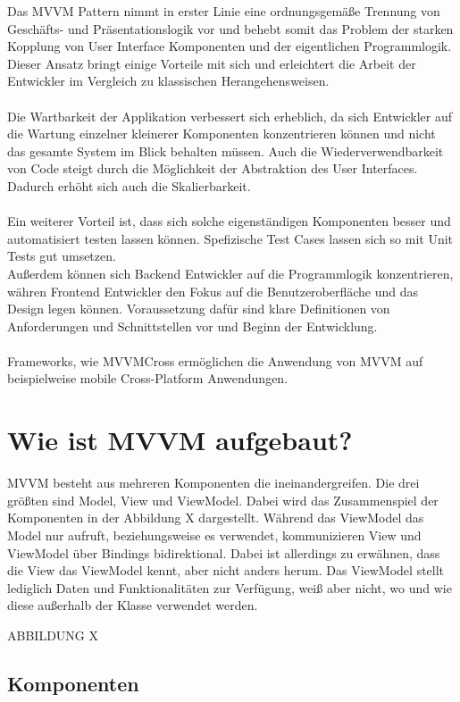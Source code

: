 \documentclass[titlepage=false,12pt]{scrreprt}
\begin{document}
Das MVVM Pattern nimmt in erster Linie eine ordnungsgemäße Trennung von Geschäfts- und Präsentationslogik vor und
behebt somit das Problem der starken Kopplung von User Interface Komponenten und der eigentlichen Programmlogik.
Dieser Ansatz bringt einige Vorteile mit sich und erleichtert die Arbeit der Entwickler im Vergleich zu klassischen
Herangehensweisen.\\
\\
Die Wartbarkeit der Applikation verbessert sich erheblich, da sich Entwickler auf die Wartung einzelner kleinerer
Komponenten konzentrieren können und nicht das gesamte System im Blick behalten müssen. Auch die Wiederverwendbarkeit
von Code steigt durch die Möglichkeit der Abstraktion des User Interfaces. Dadurch erhöht sich auch die Skalierbarkeit.\\
\\
Ein weiterer Vorteil ist, dass sich solche eigenständigen Komponenten besser und automatisiert testen lassen können.
Spefizische Test Cases lassen sich so mit Unit Tests gut umsetzen.
\\
Außerdem können sich Backend Entwickler auf die Programmlogik konzentrieren, währen Frontend Entwickler den Fokus
auf die Benutzeroberfläche und das Design legen können. Voraussetzung dafür sind klare Definitionen von
Anforderungen und Schnittstellen vor und Beginn der Entwicklung.\\
\\
Frameworks, wie MVVMCross ermöglichen die Anwendung von MVVM auf beispielweise mobile Cross-Platform Anwendungen.

\chapter{Wie ist MVVM aufgebaut?}

MVVM besteht aus mehreren Komponenten die ineinandergreifen. Die drei 
größten sind Model, View und ViewModel. Dabei wird das Zusammenspiel 
der Komponenten in der Abbildung X dargestellt. Während das ViewModel das Model
nur aufruft, beziehungsweise es verwendet, kommunizieren View und ViewModel über
Bindings bidirektional. Dabei ist allerdings zu erwähnen, dass die View das ViewModel
kennt, aber nicht anders herum. Das ViewModel stellt lediglich Daten und Funktionalitäten
zur Verfügung, weiß aber nicht, wo und wie diese außerhalb der Klasse verwendet werden.

ABBILDUNG X

\section{Komponenten}
\end{document}
